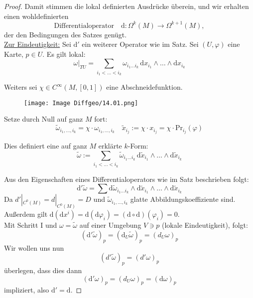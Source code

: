 \documentclass[fleqn, 12pt, letterpaper]{article}
\newcommand{\txt}[1]{\text{#1}}
\begin{document}
\begin{proof}
Damit stimmen die lokal definierten Ausdrücke überein, und wir erhalten einen wohldefinierten
\[
\text{Differentialoperator} \quad \mathrm{d} : \Omega^k(M) \longrightarrow \Omega^{k+1}(M),
\]
der den Bedingungen des Satzes genügt.\\

\underline{Zur Eindeutigkeit:}
Sei \( \mathrm{d}' \) ein weiterer Operator wie im Satz. Sei \( (U, \varphi) \) eine Karte, \( p \in U \). Es gilt lokal:
\[
\omega|_{TU} = \sum_{i_1 < \dots < i_k} \omega_{i_1 \dots i_k} \, \mathrm{d}x_{i_1} \wedge \dots \wedge \mathrm{d}x_{i_k}
\]

Weiters sei \( \chi \in C^\infty(M, [0,1]) \) eine Abschneidefunktion.
  \begin{figure}[H]
    \centering
    \texttt{[image: Image Diffgeo/14.01.png]}
 \end{figure}

Setze durch Null auf ganz \( M \) fort:
\[
\tilde{\omega}_{i_1, \dots, i_k} = \chi \cdot \omega_{i_1, \dots, i_k} \quad \tilde{x}_{i_j} := \chi \cdot x_{i_j} = \chi \cdot \txt{Pr}_{i_j}(\varphi)
\]

Dies definiert eine auf ganz \( M \) erklärte \( k \)-Form:
\[
\widetilde{\omega} := \sum_{i_1 < \dots < i_k} \widetilde{\omega}_{i_1 \dots i_k} \, \mathrm{d} \widetilde{x}_{i_1} \wedge \dots \wedge \mathrm{d} \widetilde{x}_{i_k}
\]

Aus den Eigenschaften eines Differentialoperators wie im Satz beschrieben folgt:
\[
\mathrm{d}' \widetilde{\omega} = \sum \mathrm{d} \widetilde{\omega}_{i_1 \dots i_k} \wedge \mathrm{d} \widetilde{x}_{i_1} \wedge \dots \wedge \mathrm{d} \widetilde{x}_{i_k} 
\]
Da $d'|_{C^0(M)}=d|_{C^0(M)}=D$ und $\tilde{\omega}_{i_1,\dots,i_k}$ glatte Abbildungskoeffiziente sind. Außerdem gilt \( \mathrm{d}(\mathrm{d}x^i) = \mathrm{d}(\mathrm{d} \varphi_i) = (\mathrm{d} \circ \mathrm{d})(\varphi_i) = 0 \).\\

Mit Schritt I und \( \omega = \widetilde{\omega} \) auf einer Umgebung \( V \ni p \) (lokale Eindeutigkeit), folgt:
\[
(\mathrm{d}' \widetilde{\omega})_p = (\mathrm{d}_U \tilde{\omega})_p=(d_U\omega)_p
\]
Wir wollen uns nun 
\[(d'\tilde{\omega})_p=(d'\omega)_p\]
überlegen, dass dies dann
\[
(\mathrm{d}' \omega)_p = (d_U\omega)_p= (\mathrm{d} {\omega})_p
\]
impliziert, also \( \mathrm{d}' = \mathrm{d} \).


\end{proof}
\end{document}
